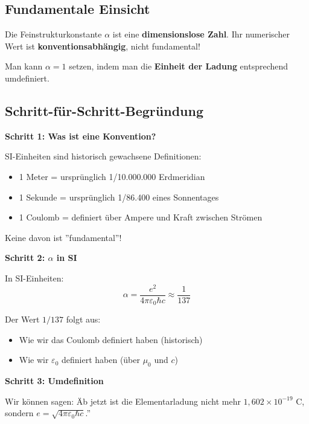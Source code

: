 	\subsection{Fundamentale Einsicht}
	
	\begin{tcolorbox}[colback=blue!5!white,colframe=blue!75!black,title=Kernaussage]
		Die Feinstrukturkonstante $\alpha$ ist eine \textbf{dimensionslose Zahl}. Ihr numerischer Wert ist \textbf{konventionsabhängig}, nicht fundamental!
		
		Man kann $\alpha = 1$ setzen, indem man die \textbf{Einheit der Ladung} entsprechend umdefiniert.
	\end{tcolorbox}
	
	\subsection{Schritt-für-Schritt-Begründung}
	
	\textbf{Schritt 1: Was ist eine Konvention?}
	
	SI-Einheiten sind historisch gewachsene Definitionen:
	\begin{itemize}
		\item 1 Meter = ursprünglich 1/10.000.000 Erdmeridian
		\item 1 Sekunde = ursprünglich 1/86.400 eines Sonnentages
		\item 1 Coulomb = definiert über Ampere und Kraft zwischen Strömen
	\end{itemize}
	
	Keine davon ist ''fundamental''!
	
	\textbf{Schritt 2: $\alpha$ in SI}
	
	In SI-Einheiten:
	\begin{equation}
		\alpha = \frac{e^2}{4\pi\varepsilon_0\hbar c} \approx \frac{1}{137}
	\end{equation}
	
	Der Wert $1/137$ folgt aus:
	\begin{itemize}
		\item Wie wir das Coulomb definiert haben (historisch)
		\item Wie wir $\varepsilon_0$ definiert haben (über $\mu_0$ und $c$)
	\end{itemize}
	
	\textbf{Schritt 3: Umdefinition}
	
	Wir können sagen: Äb jetzt ist die Elementarladung nicht mehr $1{,}602 \times 10^{-19}$ C, sondern $e = \sqrt{4\pi\varepsilon_0\hbar c}$.''
	
